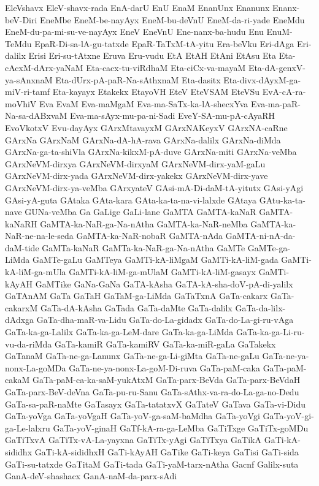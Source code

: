{EleVshavx
EleV-shavx-rada
EnA-darU
EnU
EnaM
EnanUnx
Enanunx
Enanx-beV-Diri
EneMbe
EneM-be-nayAyx
EneM-bu-deVnU
EneM-da-ri-yade
EneMdu
EneM-du-pa-mi-su-ve-nayAyx
EneV
EneVnU
Ene-nanx-ba-hudu
Enu
EnuM-TeMdu
EpaR-Di-sa-lA-gu-tatxde
EpaR-TaTxM-tA-yitu
Era-beVku
Eri-dAga
Eri-dalilx
Erisi
Eri-su-tAtxne
Eruva
Eru-vudu
EtA
EtAH
EtAni
EtAsu
Eta
Eta-cAcxM-dArx-yaNaM
Eta-cacx-tu-viRdhaM
Eta-ciCx-va-mayaM
Eta-dA-genxV-ya-sAnxnaM
Eta-dUrx-pA-paR-Na-sAthxnaM
Eta-dasitx
Eta-divx-dAyxM-ga-miV-ri-tamf
Eta-kayayx
Etakekx
EtayoVH
EteV
EteVSAM
EteVSu
EvA-cA-ra-moVhiV
Eva
EvaM
Eva-maMgaM
Eva-ma-SaTx-ka-lA-shecxYva
Eva-ma-paR-Na-sa-dABxvaM
Eva-ma-sAyx-mu-pa-ni-Sadi
EveY-SA-mu-pA-cAyaRH
EvoVkotxV
Evu-dayAyx
GArxMtavayxM
GArxNAKeyxV
GArxNA-caRne
GArxNa
GArxNaM
GArxNa-dA-hA-rava
GArxNa-dalilx
GArxNa-diMda
GArxNa-ga-ta-shiVla
GArxNa-kikxM-pA-duve
GArxNa-miti
GArxNa-veMba
GArxNeVM-dirxya
GArxNeVM-dirxyaM
GArxNeVM-dirx-yaM-gaLu
GArxNeVM-dirx-yada
GArxNeVM-dirx-yakekx
GArxNeVM-dirx-yave
GArxNeVM-dirx-ya-veMba
GArxyateV
GAsi-mA-Di-daM-tA-yitutx
GAsi-yAgi
GAsi-yA-guta
GAtaka
GAta-kara
GAta-ka-ta-na-vi-lalxde
GAtaya
GAtu-ka-ta-nave
GUNa-veMba
Ga
GaLige
GaLi-lane
GaMTA
GaMTA-kaNaR
GaMTA-kaNaRH
GaMTA-ka-NaR-ga-Na-nAtha
GaMTA-ka-NaR-neMba
GaMTA-ka-NaR-ne-na-le-seda
GaMTA-ka-NaR-nobaR
GaMTA-nAda
GaMTA-ni-nA-da-daM-tide
GaMTa-kaNaR
GaMTa-ka-NaR-ga-Na-nAtha
GaMTe
GaMTe-ga-LiMda
GaMTe-gaLu
GaMTeya
GaMTi-kA-liMgaM
GaMTi-kA-liM-gada
GaMTi-kA-liM-ga-mUla
GaMTi-kA-liM-ga-mUlaM
GaMTi-kA-liM-gasayx
GaMTi-kAyAH
GaMTike
GaNa-GaNa
GaTA-kAsha
GaTA-kA-sha-doV-pA-di-yalilx
GaTAnAM
GaTa
GaTaH
GaTaM-ga-LiMda
GaTaTxnA
GaTa-cakarx
GaTa-cakarxM
GaTa-dA-kAsha
GaTada
GaTa-daMte
GaTa-dalilx
GaTa-da-lilx-dAdxga
GaTa-dha-maR-va-Lidu
GaTa-do-La-gidadx
GaTa-do-La-gi-ru-vAga
GaTa-ka-ga-Lalilx
GaTa-ka-ga-LeM-dare
GaTa-ka-ga-LiMda
GaTa-ka-ga-Li-ru-vu-da-riMda
GaTa-kamiR
GaTa-kamiRV
GaTa-ka-miR-gaLa
GaTakekx
GaTanaM
GaTa-ne-ga-Lanunx
GaTa-ne-ga-Li-giMta
GaTa-ne-gaLu
GaTa-ne-ya-nonx-La-goMDa
GaTa-ne-ya-nonx-La-goM-Di-ruva
GaTa-paM-caka
GaTa-paM-cakaM
GaTa-paM-ca-ka-saM-yukAtxM
GaTa-parx-BeVda
GaTa-parx-BeVdaH
GaTa-parx-BeV-deVna
GaTa-pu-ru-Sanu
GaTa-sAthx-va-ra-do-La-ga-no-Dedu
GaTa-sa-paR-naMte
GaTasayx
GaTa-tatatxvX
GaTateV
GaTava
GaTa-vi-Didu
GaTa-yoVga
GaTa-yoVgaH
GaTa-yoV-ga-saM-baMdha
GaTa-yoVgi
GaTa-yoV-gi-ga-Le-lalxru
GaTa-yoV-ginaH
GaTf-kA-ra-ga-LeMba
GaTiTxge
GaTiTx-goMDu
GaTiTxvA
GaTiTx-vA-La-yayxna
GaTiTx-yAgi
GaTiTxya
GaTikA
GaTi-kA-sididhx
GaTi-kA-sididhxH
GaTi-kAyAH
GaTike
GaTi-keya
GaTisi
GaTi-sida
GaTi-su-tatxde
GaTitaM
GaTi-tada
GaTi-yaM-tarx-nAtha
Gacnf
Galilx-suta
GanA-deV-shashacx
GanA-naM-da-parx-sAdi
}

